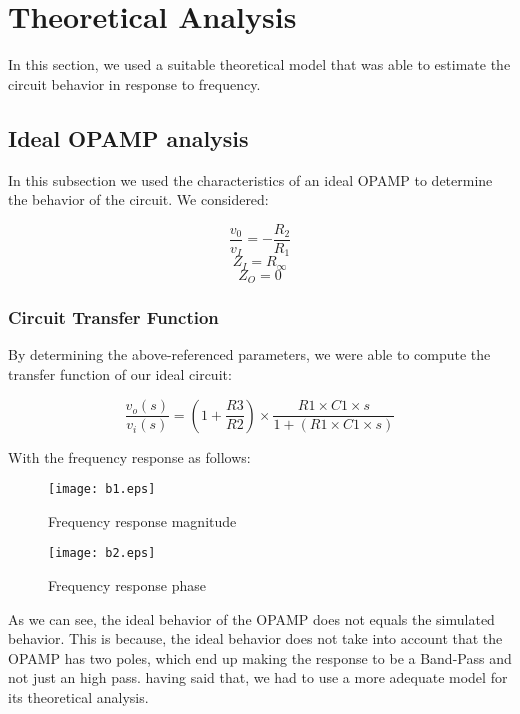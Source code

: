 \section{Theoretical Analysis}
\label{sec:analysis}

In this section, we used a suitable theoretical model that was able to estimate the  circuit behavior in response to frequency.

\subsection{Ideal OPAMP analysis}

In this subsection we used the characteristics of an ideal OPAMP to determine the behavior of the circuit. We considered:

\begin{equation}
   \frac{v_0}{v_I} = - \frac{R_2}{R_1} 
\end{equation}
\begin{equation}
   Z_I = R_\infty
\end{equation}
\begin{equation}
   Z_O = 0
\end{equation}

\subsubsection{Circuit Transfer Function}

By determining the above-referenced parameters, we were able to compute the transfer function of our ideal circuit:

\begin{equation}
   \frac{v_o(s)}{v_i(s)} =\left(1 + \frac{R3}{R2}\right) \times \frac{R1 \times C1 \times s}{1 + (R1 \times C1 \times s)}
\end{equation}

With the frequency response as follows: 

\begin{figure}[H] \centering
\texttt{[image: b1.eps]}
\caption{Frequency response magnitude}
\label{fig:rc2}
\end{figure} 

\begin{figure}[H] \centering
\texttt{[image: b2.eps]}
\caption{Frequency response phase}
\label{fig:rc2}
\end{figure} 

As we can see, the ideal behavior of the OPAMP does not equals the simulated behavior. This is because, the ideal behavior does not take into account that the OPAMP has two poles, which end up making the response to be a Band-Pass and not just an high pass. having said that, we had to use a more adequate model for its theoretical analysis. 

